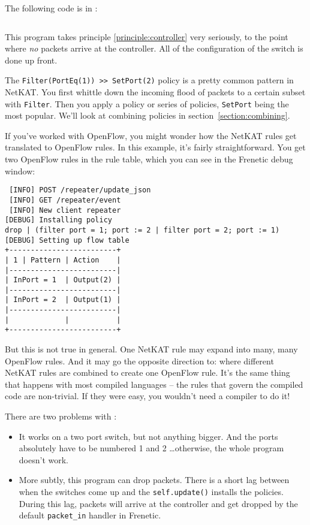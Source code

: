 The following code is in :

\inputminted{python}{code/netkat_principles/repeater2.py}

This program takes principle \ref{principle:controller} very seriously, to the point where \emph{no} packets 
arrive at the controller.
All of the configuration of the switch is done up front.

The \texttt{Filter(PortEq(1)) >> SetPort(2)} policy is a pretty common pattern in NetKAT.
You first whittle down the incoming flood of packets to a certain subset with \texttt{Filter}.
Then you apply a policy or series of policies, \texttt{SetPort} being the most popular.
We'll look at combining policies in section~\ref{section:combining}.

If you've worked with OpenFlow, you might wonder how the NetKAT rules get translated to OpenFlow rules.
In this example, it's fairly straightforward.
You get two OpenFlow rules in the rule table, which you can see in the Frenetic debug window:

\begin{verbatim}
 [INFO] POST /repeater/update_json
 [INFO] GET /repeater/event
 [INFO] New client repeater
[DEBUG] Installing policy
drop | (filter port = 1; port := 2 | filter port = 2; port := 1)
[DEBUG] Setting up flow table
+-------------------------+
| 1 | Pattern | Action    |
|-------------------------|
| InPort = 1  | Output(2) |
|-------------------------|
| InPort = 2  | Output(1) |
|-------------------------|
|             |           |
+-------------------------+
\end{verbatim}

But this is not true in general.  
One NetKAT rule may expand into many, many OpenFlow rules.
And it may go the opposite direction to: where different NetKAT rules are combined to create one OpenFlow rule.
It's the same thing that happens with most compiled languages -- the rules that govern the compiled code
are non-trivial. 
If they were easy, you wouldn't need a compiler to do it!

There are two problems with :

\begin{itemize}
  \item It works on a two port switch, but not anything bigger.  
  And the ports absolutely have
  to be numbered 1 and 2 \ldots otherwise, the whole program doesn't work.
  \item More subtly, this program can drop packets.  
  There is a short lag between when the switches come up and the \texttt{self.update()} installs
  the policies. 
  During this lag, packets will arrive at the controller and get dropped by the 
  default \texttt{packet\_in} handler in Frenetic.   
\end{itemize}

